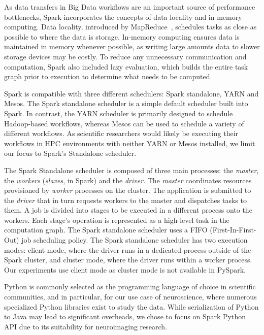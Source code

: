 \documentclass[conference]{IEEEtran}
\begin{document}
As data transfers in Big Data workflows are an important source of performance
bottlenecks, Spark incorporates the concepts of data locality and in-memory 
computing. Data locality, introduced by MapReduce~\cite{dean2008mapreduce},
schedules
tasks as close as possible to where the data is storage. In-memory computing
ensures data is maintained in memory whenever possible, as writing large 
amounts data to slower storage devices may be costly. To reduce any unnecessary
communication and computation, Spark also included lazy evaluation, which
builds the entire task graph prior to execution to determine what needs to be
computed.

Spark is compatible with three different schedulers: Spark
standalone, YARN and Mesos.
The Spark standalone scheduler is a simple default scheduler built into Spark.
In contrast, the YARN scheduler is primarily designed to schedule Hadoop-based 
workflows, whereas Mesos can be used to schedule
a variety of different workflows. As scientific researchers would likely be
executing their workflows in HPC environments with neither YARN or Mesos
installed, we limit our focus to Spark's Standalone scheduler.


The Spark Standalone scheduler is composed of three main processes: the
\emph{master}, the \emph{workers} (\emph{slaves}, in Spark) and the
\emph{driver}. The \emph{master} coordinates resources provisioned by
\emph{worker} processes on the cluster. The application is submitted to the
\emph{driver} that in turn requests workers to the master and dispatches tasks
to them. A job is divided into stages to be executed in a different process onto
the workers. Each stage's operation is represented as a high-level task in the
computation graph. The Spark standalone scheduler uses a FIFO 
(First-In-First-Out) job scheduling policy. The Spark standalone scheduler has
two execution modes: client mode, where the driver runs in a dedicated process
outside of the Spark cluster, and cluster mode, where the driver runs within
a worker process. Our experiments use client mode as cluster mode is not
available in PySpark. 


Python is commonly selected as the programming language of choice in scientific
communities, and in particular, for our use case of neuroscience, where
numerous specialized Python libraries exist to study the data.
While serialization of Python to Java may lead to significant overheads, we
chose to focus on Spark Python API due to its suitability for neuroimaging
research. 
\end{document}
